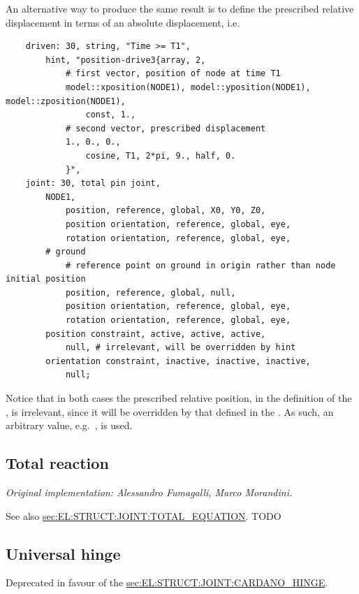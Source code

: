 An alternative way to produce the same result is to define the prescribed relative displacement in terms of an absolute displacement, i.e.
\begin{verbatim}
    driven: 30, string, "Time >= T1",
        hint, "position-drive3{array, 2,
            # first vector, position of node at time T1
            model::xposition(NODE1), model::yposition(NODE1), model::zposition(NODE1),
                const, 1.,
            # second vector, prescribed displacement
            1., 0., 0.,
                cosine, T1, 2*pi, 9., half, 0.
            }",
    joint: 30, total pin joint,
        NODE1,
            position, reference, global, X0, Y0, Z0,
            position orientation, reference, global, eye,
            rotation orientation, reference, global, eye,
        # ground
            # reference point on ground in origin rather than node initial position
            position, reference, global, null,
            position orientation, reference, global, eye,
            rotation orientation, reference, global, eye,
        position constraint, active, active, active,
            null, # irrelevant, will be overridden by hint
        orientation constraint, inactive, inactive, inactive,
            null;
\end{verbatim}
Notice that in both cases the prescribed relative position, in the definition of the ,
is irrelevant, since it will be overridden by that defined in the .
As such, an arbitrary value, e.g.\ , is used.



\subsection{Total reaction}
\label{sec:EL:STRUCT:JOINT:TOTAL_REACTION}
\emph{Original implementation: Alessandro Fumagalli, Marco Morandini.}

See also 
\hyperref{\kw{total equation}}{\kw{total equation} (see Section~}{)}{sec:EL:STRUCT:JOINT:TOTAL_EQUATION}.
TODO




\subsection{Universal hinge}
\label{sec:EL:STRUCT:JOINT:UNIVERSAL_HINGE}
Deprecated in favour of the
\hyperref{\kw{cardano hinge}}{\kw{cardano hinge} (see Section~}{)}{sec:EL:STRUCT:JOINT:CARDANO_HINGE}.



